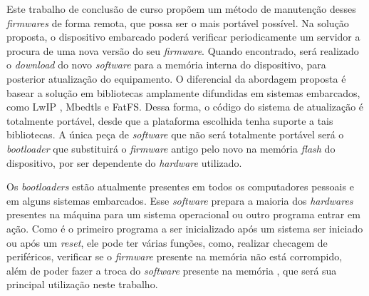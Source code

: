 
Este trabalho de conclusão de curso propõem um método de manutenção desses \textit{firmwares} de forma remota, que possa ser o mais portável possível.
Na solução proposta, o dispositivo embarcado poderá verificar periodicamente um servidor a procura de uma nova versão do seu \textit{firmware}. Quando encontrado, será realizado o \textit{download} do novo \textit{software} para a memória interna do dispositivo, para posterior atualização do equipamento. O diferencial da abordagem proposta é basear a solução em bibliotecas amplamente difundidas em sistemas embarcados, como LwIP \cite{LWIP}, Mbedtls \cite{mbedtls} e FatFS\cite{FATFS}. Dessa forma, o código do sistema de atualização é totalmente portável, desde que a plataforma escolhida tenha suporte a tais bibliotecas. A única peça de \textit{software} que não será totalmente portável será o \textit{bootloader} que substituirá o \textit{firmware} antigo pelo novo na memória \textit{flash} do dispositivo, por ser dependente do \textit{hardware} utilizado.

 

Os \textit{bootloaders} estão atualmente presentes em todos os computadores pessoais e em alguns sistemas embarcados. Esse \textit{software} prepara a maioria dos \textit{hardwares} presentes na máquina para um sistema operacional ou outro programa entrar em ação.
Como é o primeiro programa a ser inicializado após um sistema ser iniciado ou após um \textit{reset}, ele pode ter várias funções, como, realizar checagem de periféricos, verificar se o \textit{firmware} presente na memória não está corrompido, além de poder fazer a troca do \textit{software} presente na memória \cite{DavesDurlin2013}, que será sua principal utilização neste trabalho.

